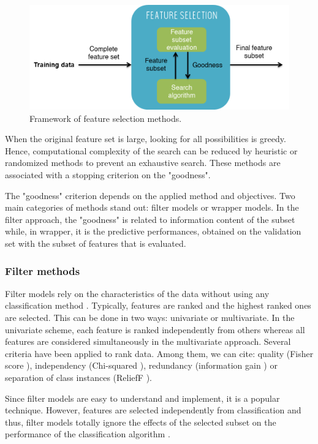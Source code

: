 \documentclass[a4paper,10pt]{article}
\begin{document}
\begin{figure}[htbp]
\centerline{\includegraphics[width=0.6\linewidth]{./figures/featureselection.png}}
\caption{Framework of feature selection methods.}
\label{processFeatureSelection}
\end{figure}

When the original feature set is large, looking for all possibilities is greedy. Hence, computational complexity of the search can be reduced by heuristic or randomized methods to prevent an exhaustive search. These methods are associated with a stopping criterion on the "goodness".

The "goodness" criterion depends on the applied method and objectives. Two main categories of methods stand out: filter models or wrapper models. In the filter approach, the "goodness" is related to information content of the subset while, in wrapper, it is the predictive performances, obtained on the validation set with the subset of features that is evaluated.

\subsubsection{Filter methods}

Filter models rely on the characteristics of the data without using any classification method \cite{liu2007computational}. Typically, features are ranked and the highest ranked ones are selected. This can be done in two ways: univariate or multivariate. In the univariate scheme, each feature is ranked independently from others whereas all features are considered simultaneously in the multivariate approach. Several criteria have been applied to rank data. Among them, we can cite: quality (Fisher score \cite{duda2012pattern,gu2012generalized}), independency (Chi-squared \cite{bonaccorso2017machine}), redundancy (information gain \cite{roobaert2006information}) or separation of class instances (ReliefF \cite{kira1992feature}).

Since filter models are easy to understand and implement, it is a popular technique. However, features are selected independently from classification and thus, filter models totally ignore the effects of the selected subset on the performance of the classification algorithm \cite{hall1999feature}.
\end{document}
